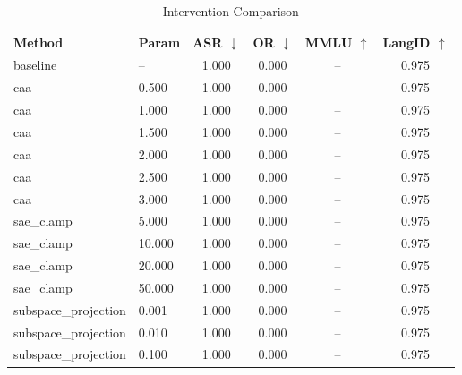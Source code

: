 \begin{table}[htbp]
\centering
\caption{Intervention Comparison}
\label{tab:interventions}
\small
\begin{tabular}{llcccc}
\toprule
Method & Param & ASR $\downarrow$ & OR $\downarrow$ & MMLU $\uparrow$ & LangID $\uparrow$ \\
\midrule
baseline & -- & 1.000 & 0.000 & -- & 0.975 \\
\midrule
caa & 0.500 & 1.000 & 0.000 & -- & 0.975 \\
caa & 1.000 & 1.000 & 0.000 & -- & 0.975 \\
caa & 1.500 & 1.000 & 0.000 & -- & 0.975 \\
caa & 2.000 & 1.000 & 0.000 & -- & 0.975 \\
caa & 2.500 & 1.000 & 0.000 & -- & 0.975 \\
caa & 3.000 & 1.000 & 0.000 & -- & 0.975 \\
\midrule
sae_clamp & 5.000 & 1.000 & 0.000 & -- & 0.975 \\
sae_clamp & 10.000 & 1.000 & 0.000 & -- & 0.975 \\
sae_clamp & 20.000 & 1.000 & 0.000 & -- & 0.975 \\
sae_clamp & 50.000 & 1.000 & 0.000 & -- & 0.975 \\
\midrule
subspace_projection & 0.001 & 1.000 & 0.000 & -- & 0.975 \\
subspace_projection & 0.010 & 1.000 & 0.000 & -- & 0.975 \\
subspace_projection & 0.100 & 1.000 & 0.000 & -- & 0.975 \\
\bottomrule
\end{tabular}
\end{table}